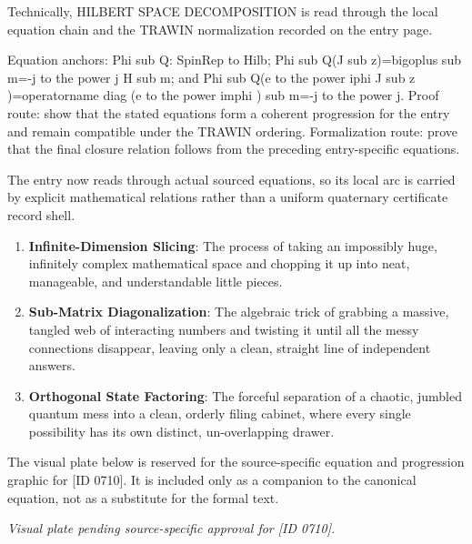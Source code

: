 Technically, HILBERT SPACE DECOMPOSITION is read through the local equation chain and the TRAWIN normalization recorded on the entry page.

Equation anchors: Phi sub Q: SpinRep to Hilb; Phi sub Q(J sub z)=bigoplus sub m=-j to the power j H sub m; and Phi sub Q(e to the power iphi J sub z )=operatorname diag (e to the power imphi ) sub m=-j to the power j. Proof route: show that the stated equations form a coherent progression for the entry and remain compatible under the TRAWIN ordering. Formalization route: prove that the final closure relation follows from the preceding entry-specific equations.

The entry now reads through actual sourced equations, so its local arc is carried by explicit mathematical relations rather than a uniform quaternary certificate record shell.
\endgroup

\begin{enumerate}[leftmargin=1.6em,itemsep=6pt,topsep=4pt]
\item \textbf{Infinite-Dimension Slicing}: The process of taking an impossibly huge, infinitely complex mathematical space and chopping it up into neat, manageable, and understandable little pieces.
\item \textbf{Sub-Matrix Diagonalization}: The algebraic trick of grabbing a massive, tangled web of interacting numbers and twisting it until all the messy connections disappear, leaving only a clean, straight line of independent answers.
\item \textbf{Orthogonal State Factoring}: The forceful separation of a chaotic, jumbled quantum mess into a clean, orderly filing cabinet, where every single possibility has its own distinct, un-overlapping drawer.
\end{enumerate}

\begingroup\footnotesize\sloppy
The visual plate below is reserved for the source-specific equation and progression graphic for [ID 0710]. It is included only as a companion to the canonical equation, not as a substitute for the formal text.
\par\endgroup
\begingroup\footnotesize\itshape
Visual plate pending source-specific approval for [ID 0710].
\par\endgroup

